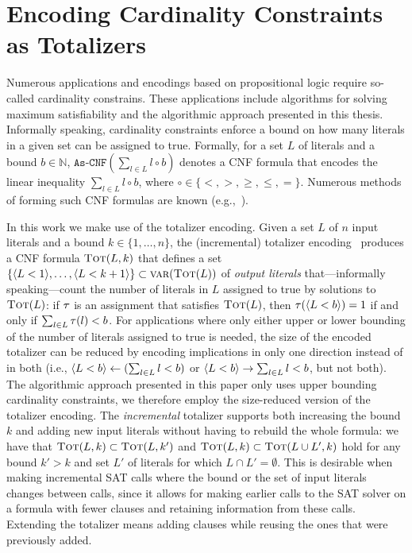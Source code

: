 \section{Encoding Cardinality Constraints as Totalizers\label{sec:card-const}}

Numerous applications and encodings based on propositional logic require so-called cardinality constrains.
These applications include algorithms for solving maximum satisfiability and the algorithmic approach presented in this thesis.
Informally speaking, cardinality constraints enforce a bound on how many literals in a given set can be assigned to true.
Formally, for a set $L$ of literals and a bound $b \in \mathbb{N}$, $\texttt{As-CNF}\left(\sum_{l \in L} l \circ b\right)$ denotes a CNF formula that encodes the linear inequality $\sum_{l \in L} l \circ b$, where $\circ \in \{< ,> ,\geq, \leq, =\}$.
Numerous methods of forming such CNF formulas are known (e.g.,~\autocites{DBLP:conf/cp/BailleuxB03,DBLP:conf/cp/Sinz05,DBLP:journals/jsat/EenS06}).

In this work we make use of the totalizer encoding.
Given a set $L$ of $n$ input literals and a bound $k\in\{1,\dots,n\}$, the (incremental) totalizer encoding~\autocites{DBLP:conf/cp/BailleuxB03,DBLP:conf/cp/MartinsJML14} produces a CNF formula $\textsc{Tot}(L, k)$ that defines a set $\{\langle L < 1 \rangle, \ldots, \langle L < k+1 \rangle\} \subset \textsc{var}(\textsc{Tot}(L))$ of \emph{output literals} that---informally speaking---count the number of literals in $L$ assigned to true by solutions to $\textsc{Tot}(L)$:
if $\tau$ is an assignment that satisfies $\textsc{Tot}(L)$, then $\tau(\langle L < b \rangle) = 1$ if and only if $\sum_{l \in L} \tau(l) < b$.
For applications where only either upper or lower bounding of the number of literals assigned to true is needed, the size of the encoded totalizer can be reduced by encoding implications in only one direction instead of in both (i.e., $\langle L < b \rangle \leftarrow (\sum_{l \in L} l < b)$ or $\langle L < b \rangle \rightarrow \sum_{l \in L} l < b$, but not both).
The algorithmic approach presented in this paper only uses upper bounding cardinality constraints, we therefore employ the size-reduced version of the totalizer encoding.
The \emph{incremental} totalizer supports both increasing the bound $k$ and adding new input literals without having to rebuild the whole formula:
we have that $\textsc{Tot}(L, k) \subset \textsc{Tot}(L, k')$ and $\textsc{Tot}(L, k) \subset  \textsc{Tot}(L \cup L', k)$ hold for any bound $k' > k$ and set $L'$ of literals for which $L \cap L' =  \emptyset$. 
This is desirable when making incremental SAT calls where the bound or the set of input literals changes between calls, since it allows for making earlier calls to the SAT solver on a formula with fewer clauses and retaining information from these calls.
Extending the totalizer means adding clauses while reusing the ones that were previously added.

